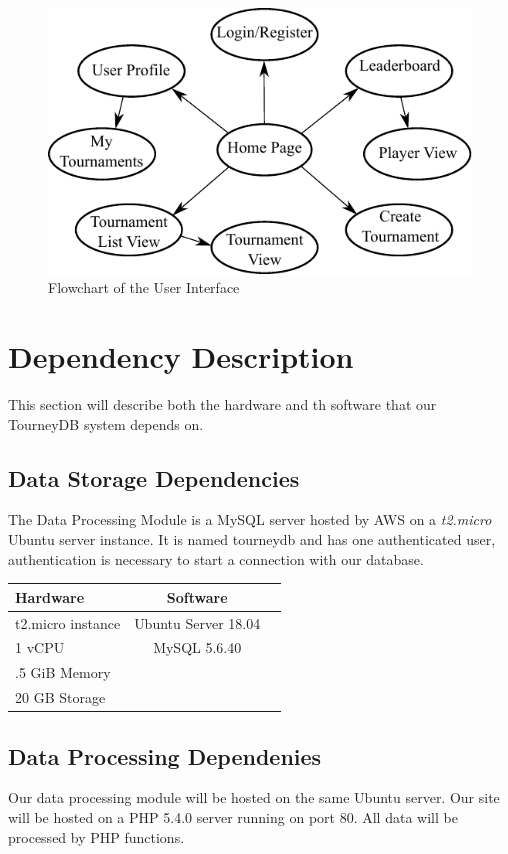 \documentclass{article}
\begin{document}
\begin{figure}[H]
      \centering
      \includegraphics[width=.8\linewidth]{Figures/UIFlowchart.pdf}
      \caption{Flowchart of the User Interface}
      \label{fig:uiflow}
\end{figure}


\section{Dependency Description}
This section will describe both the hardware and th software that our TourneyDB system depends on.

\subsection{Data Storage Dependencies}
The Data Processing Module is a MySQL server hosted by AWS on a \emph{t2.micro} Ubuntu server instance. It is named tourneydb and has one authenticated user, authentication is necessary to start a connection with our database.




\begin{center}
  \begin{tabular}{ | l | c | r |}
    \hline
    \textbf{Hardware} & \textbf{Software}\\ \hline
    t2.micro instance  &  Ubuntu Server 18.04 \\
    1 vCPU  & MySQL 5.6.40 \\ 
    .5 GiB Memory  &  \\
    20 GB Storage  &  \\
    \hline
  \end{tabular}
\end{center}


\subsection{Data Processing Dependenies}
Our data processing module will be hosted on the same Ubuntu server. Our site will be hosted on a PHP 5.4.0 server running  on port 80. All data will be processed by PHP functions.
\end{document}
